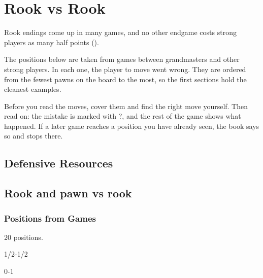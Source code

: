 \chapter{Rook vs Rook}\label{ch:rook-vs-rook}
Rook endings come up in many games, and no other endgame costs strong players as many half
points ().

The positions below are taken from games between grandmasters and other strong players. In each
one, the player to move went wrong. They are ordered from the fewest pawns on the board to the
most, so the first sections hold the cleanest examples.

Before you read the moves, cover them and find the right move yourself. Then read on: the
mistake is marked with ?, and the rest of the game shows what happened. If a later game reaches
a position you have already seen, the book says so and stops there.


\section{Defensive Resources}





\section{Rook and pawn vs rook}
\subsection{Positions from Games}
20 positions.


1/2-1/2\par
{}

0-1\par
{}

